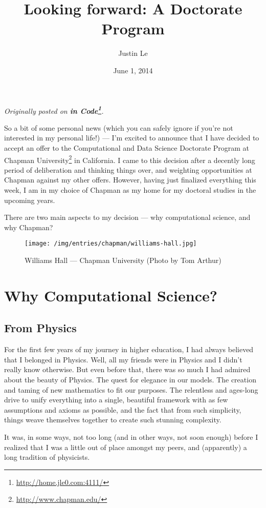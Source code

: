 \documentclass[]{article}
\title{Looking forward: A Doctorate Program}
\author{Justin Le}
\date{June 1, 2014}
\renewcommand{\href}[2]{#2\footnote{\url{#1}}}
\begin{document}
\maketitle

\emph{Originally posted on \textbf{\href{http://home.jle0.com:4111/}{in
Code}}.}

So a bit of some personal news (which you can safely ignore if you're
not interested in my personal life!) --- I'm excited to announce that I
have decided to accept an offer to the Computational and Data Science
Doctorate Program at \href{http://www.chapman.edu/}{Chapman University}
in California. I came to this decision after a decently long period of
deliberation and thinking things over, and weighting opportunities at
Chapman against my other offers. However, having just finalized
everything this week, I am in my choice of Chapman as my home for my
doctoral studies in the upcoming years.

There are two main aspects to my decision --- why computational science,
and why Chapman?

\begin{figure}[htbp]
\centering
\texttt{[image: /img/entries/chapman/williams-hall.jpg]}
\caption{Williams Hall --- Chapman University (Photo by Tom Arthur)}
\end{figure}

\section{Why Computational Science?}\label{why-computational-science}

\subsection{From Physics}\label{from-physics}

For the first few years of my journey in higher education, I had always
believed that I belonged in Physics. Well, all my friends were in
Physics and I didn't really know otherwise. But even before that, there
was so much I had admired about the beauty of Physics. The quest for
elegance in our models. The creation and taming of new mathematics to
fit our purposes. The relentless and ages-long drive to unify everything
into a single, beautiful framework with as few assumptions and axioms as
possible, and the fact that from such simplicity, things weave
themselves together to create such stunning complexity.

It was, in some ways, not too long (and in other ways, not soon enough)
before I realized that I was a little out of place amongst my peers, and
(apparently) a long tradition of physicists.
\end{document}
